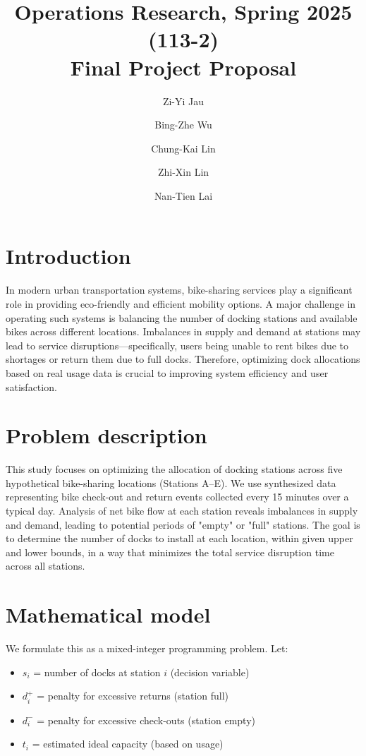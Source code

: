 \documentclass[11pt,a4paper]{article}
\title{Operations Research, Spring 2025 (113-2) \\ Final Project Proposal}
\author{Zi-Yi Jau} %
\author{Bing-Zhe Wu} %
\author{Chung-Kai Lin} %
\author{Zhi-Xin Lin} %
\author{Nan-Tien Lai} %
\affil{Department of Information Management, National Taiwan University}
\begin{document}
\maketitle

\section{Introduction}
In modern urban transportation systems, bike-sharing services play a significant role in providing eco-friendly and efficient mobility options. A major challenge in operating such systems is balancing the number of docking stations and available bikes across different locations. Imbalances in supply and demand at stations may lead to service disruptions—specifically, users being unable to rent bikes due to shortages or return them due to full docks. Therefore, optimizing dock allocations based on real usage data is crucial to improving system efficiency and user satisfaction.

\section{Problem description}
This study focuses on optimizing the allocation of docking stations across five hypothetical bike-sharing locations (Stations A–E). We use synthesized data representing bike check-out and return events collected every 15 minutes over a typical day. Analysis of net bike flow at each station reveals imbalances in supply and demand, leading to potential periods of "empty" or "full" stations. The goal is to determine the number of docks to install at each location, within given upper and lower bounds, in a way that minimizes the total service disruption time across all stations.

\newpage
\section{Mathematical model}
We formulate this as a mixed-integer programming problem. Let:
\begin{itemize}
    \item $s_i$ = number of docks at station $i$ (decision variable)
    \item $d_i^+$ = penalty for excessive returns (station full)
    \item $d_i^-$ = penalty for excessive check-outs (station empty)
    \item $t_i$ = estimated ideal capacity (based on usage)
\end{itemize}
\end{document}
